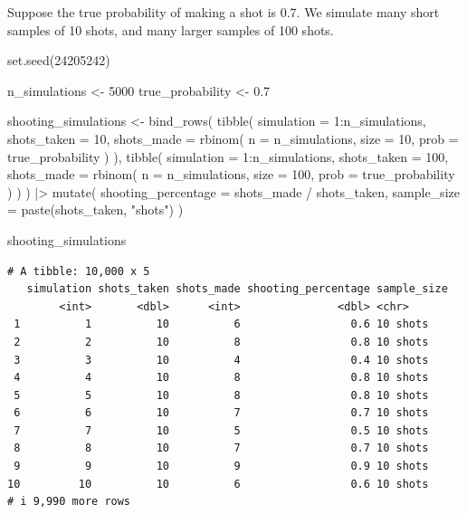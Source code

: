 \documentclass[
  letterpaper,
  DIV=11,
  numbers=noendperiod]{scrreprt}
\newenvironment{Shaded}{\begin{snugshade}}{\end{snugshade}}
\newcommand{\AttributeTok}[1]{\textcolor[rgb]{0.40,0.45,0.13}{#1}}
\newcommand{\DecValTok}[1]{\textcolor[rgb]{0.68,0.00,0.00}{#1}}
\newcommand{\FloatTok}[1]{\textcolor[rgb]{0.68,0.00,0.00}{#1}}
\newcommand{\FunctionTok}[1]{\textcolor[rgb]{0.28,0.35,0.67}{#1}}
\newcommand{\NormalTok}[1]{\textcolor[rgb]{0.00,0.23,0.31}{#1}}
\newcommand{\OtherTok}[1]{\textcolor[rgb]{0.00,0.23,0.31}{#1}}
\newcommand{\SpecialCharTok}[1]{\textcolor[rgb]{0.37,0.37,0.37}{#1}}
\newcommand{\StringTok}[1]{\textcolor[rgb]{0.13,0.47,0.30}{#1}}
\begin{document}
Suppose the true probability of making a shot is 0.7. We simulate many
short samples of 10 shots, and many larger samples of 100 shots.

\begin{Shaded}
\begin{Highlighting}[]
\FunctionTok{set.seed}\NormalTok{(}\DecValTok{24205242}\NormalTok{)}

\NormalTok{n\_simulations }\OtherTok{\textless{}{-}} \DecValTok{5000}
\NormalTok{true\_probability }\OtherTok{\textless{}{-}} \FloatTok{0.7}

\NormalTok{shooting\_simulations }\OtherTok{\textless{}{-}} \FunctionTok{bind\_rows}\NormalTok{(}
  \FunctionTok{tibble}\NormalTok{(}
    \AttributeTok{simulation =} \DecValTok{1}\SpecialCharTok{:}\NormalTok{n\_simulations,}
    \AttributeTok{shots\_taken =} \DecValTok{10}\NormalTok{,}
    \AttributeTok{shots\_made =} \FunctionTok{rbinom}\NormalTok{(}
      \AttributeTok{n =}\NormalTok{ n\_simulations,}
      \AttributeTok{size =} \DecValTok{10}\NormalTok{,}
      \AttributeTok{prob =}\NormalTok{ true\_probability}
\NormalTok{    )}
\NormalTok{  ),}
  \FunctionTok{tibble}\NormalTok{(}
    \AttributeTok{simulation =} \DecValTok{1}\SpecialCharTok{:}\NormalTok{n\_simulations,}
    \AttributeTok{shots\_taken =} \DecValTok{100}\NormalTok{,}
    \AttributeTok{shots\_made =} \FunctionTok{rbinom}\NormalTok{(}
      \AttributeTok{n =}\NormalTok{ n\_simulations,}
      \AttributeTok{size =} \DecValTok{100}\NormalTok{,}
      \AttributeTok{prob =}\NormalTok{ true\_probability}
\NormalTok{    )}
\NormalTok{  )}
\NormalTok{) }\SpecialCharTok{|\textgreater{}}
  \FunctionTok{mutate}\NormalTok{(}
    \AttributeTok{shooting\_percentage =}\NormalTok{ shots\_made }\SpecialCharTok{/}\NormalTok{ shots\_taken,}
    \AttributeTok{sample\_size =} \FunctionTok{paste}\NormalTok{(shots\_taken, }\StringTok{"shots"}\NormalTok{)}
\NormalTok{  )}

\NormalTok{shooting\_simulations}
\end{Highlighting}
\end{Shaded}

\begin{verbatim}
# A tibble: 10,000 x 5
   simulation shots_taken shots_made shooting_percentage sample_size
        <int>       <dbl>      <int>               <dbl> <chr>      
 1          1          10          6                 0.6 10 shots   
 2          2          10          8                 0.8 10 shots   
 3          3          10          4                 0.4 10 shots   
 4          4          10          8                 0.8 10 shots   
 5          5          10          8                 0.8 10 shots   
 6          6          10          7                 0.7 10 shots   
 7          7          10          5                 0.5 10 shots   
 8          8          10          7                 0.7 10 shots   
 9          9          10          9                 0.9 10 shots   
10         10          10          6                 0.6 10 shots   
# i 9,990 more rows
\end{verbatim}
\end{document}
